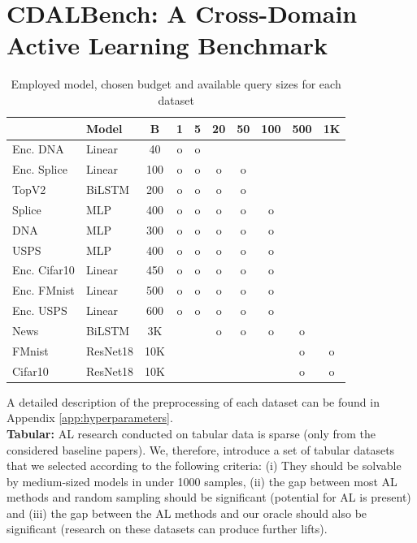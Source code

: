 \documentclass[]{article}
\begin{document}
\section{CDALBench: A Cross-Domain Active Learning Benchmark}\label{sec:datasets}
\begin{table}
	\vspace{-0.7cm}
	\caption{Employed model, chosen budget and available query sizes for each dataset}
	\vspace{0.1cm}
	\label{tab:batch_sizes}
	{\scriptsize
		\begin{tabular}{l|l|c|c|c|c|c|c|c|c}
			& Model  & B & 1 & 5 & 20 & 50 & 100 & 500 & 1K \\
			\hline
			Enc. DNA    & Linear & 40 & o & o &&&&& \\
			Enc. Splice & Linear & 100 & o & o & o & o &&&\\
			TopV2       & BiLSTM & 200 & o & o & o & o &&& \\
			Splice      & MLP    & 400 & o & o & o & o & o && \\
			DNA         & MLP    & 300 & o & o & o & o & o && \\
			USPS        & MLP    & 400 & o & o & o & o & o && \\
			Enc. Cifar10& Linear & 450 & o & o & o & o & o && \\
			Enc. FMnist & Linear & 500 & o & o & o & o & o && \\
			Enc. USPS   & Linear & 600 & o & o & o & o & o && \\
			News        & BiLSTM & 3K &&& o & o & o & o &\\
			FMnist      & ResNet18& 10K &&&&&& o & o\\
			Cifar10     & ResNet18& 10K &&&&&& o & o \\
		\end{tabular}
	}
	\vspace{-0.55cm}
\end{table}
A detailed description of the preprocessing of each dataset can be found in Appendix \ref{app:hyperparameters}. \\ [1mm]
\textbf{Tabular:}
AL research conducted on tabular data is sparse (only \cite{ashdeep} from the considered baseline papers). 
We, therefore, introduce a set of tabular datasets that we selected according to the following criteria:
(i) They should be solvable by medium-sized models in under 1000 samples, (ii) the gap between most AL methods and random sampling should be significant (potential for AL is present) and (iii) the gap between the AL methods and our oracle should also be significant (research on these datasets can produce further lifts).
\end{document}
